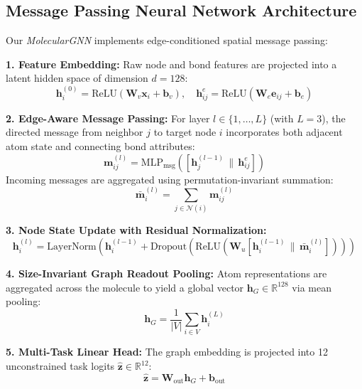 \documentclass[conference]{IEEEtran}
\begin{document}
\subsection{Message Passing Neural Network Architecture}
Our \textit{MolecularGNN} implements edge-conditioned spatial message passing:

\textbf{1. Feature Embedding:} Raw node and bond features are projected into a latent hidden space of dimension $d = 128$:
\begin{equation}
    \mathbf{h}_i^{(0)} = \text{ReLU}(\mathbf{W}_v \mathbf{x}_i + \mathbf{b}_v), \quad \mathbf{h}_{ij}^e = \text{ReLU}(\mathbf{W}_e \mathbf{e}_{ij} + \mathbf{b}_e)
\end{equation}

\textbf{2. Edge-Aware Message Passing:} For layer $l \in \{1, \dots, L\}$ (with $L=3$), the directed message from neighbor $j$ to target node $i$ incorporates both adjacent atom state and connecting bond attributes:
\begin{equation}
    \mathbf{m}_{ij}^{(l)} = \text{MLP}_{\text{msg}}\left( [\mathbf{h}_j^{(l-1)} \,\|\, \mathbf{h}_{ij}^e] \right)
\end{equation}
Incoming messages are aggregated using permutation-invariant summation:
\begin{equation}
    \mathbf{\bar{m}}_i^{(l)} = \sum_{j \in \mathcal{N}(i)} \mathbf{m}_{ij}^{(l)}
\end{equation}

\textbf{3. Node State Update with Residual Normalization:}
\begin{equation}
    \mathbf{h}_i^{(l)} = \text{LayerNorm}\left( \mathbf{h}_i^{(l-1)} + \text{Dropout}\left(\text{ReLU}\left(\mathbf{W}_u [\mathbf{h}_i^{(l-1)} \,\|\, \mathbf{\bar{m}}_i^{(l)}]\right)\right) \right)
\end{equation}

\textbf{4. Size-Invariant Graph Readout Pooling:} Atom representations are aggregated across the molecule to yield a global vector $\mathbf{h}_G \in \mathbb{R}^{128}$ via mean pooling:
\begin{equation}
    \mathbf{h}_G = \frac{1}{|V|} \sum_{i \in V} \mathbf{h}_i^{(L)}
\end{equation}

\textbf{5. Multi-Task Linear Head:} The graph embedding is projected into 12 unconstrained task logits $\hat{\mathbf{z}} \in \mathbb{R}^{12}$:
\begin{equation}
    \hat{\mathbf{z}} = \mathbf{W}_{\text{out}} \mathbf{h}_G + \mathbf{b}_{\text{out}}
\end{equation}
\end{document}
